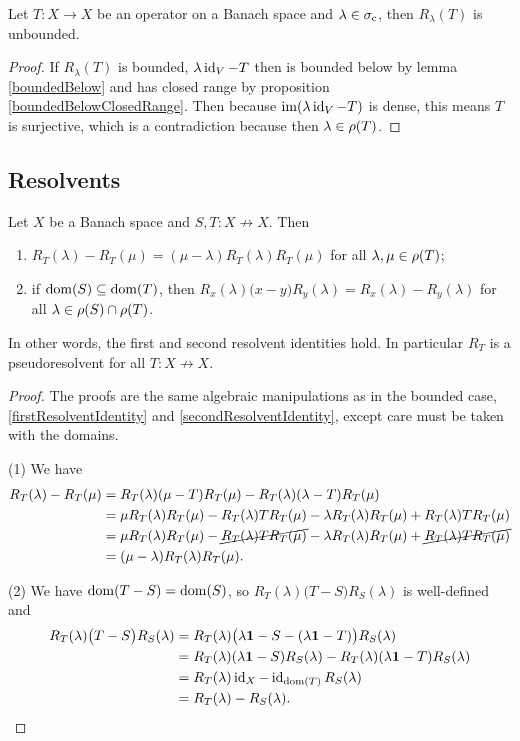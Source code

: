 \begin{proposition}
Let $T:X\to X$ be an operator on a Banach space and $\lambda\in\sigma_\text{c}$, then $R_\lambda(T)$ is unbounded.
\end{proposition}
\begin{proof}
If $R_\lambda(T)$ is bounded, $\lambda \operatorname{id}_V - T$ then is bounded below by lemma \ref{boundedBelow} and has closed range by proposition \ref{boundedBelowClosedRange}. Then because $\operatorname{im}(\lambda \operatorname{id}_V - T)$ is dense, this means $T$ is surjective, which is a contradiction because then $\lambda\in\rho(T)$.
\end{proof}

\subsection{Resolvents}

\begin{proposition}
Let $X$ be a Banach space and $S,T: X\not\to X$. Then
\begin{enumerate}
\item $R_T(\lambda) - R_T(\mu) = (\mu - \lambda)R_T(\lambda)R_T(\mu)$ for all $\lambda, \mu\in \rho(T)$;
\item if $\operatorname{dom}(S)\subseteq \operatorname{dom}(T)$, then $R_x(\lambda)\big(x-y\big)R_y(\lambda) = R_x(\lambda) - R_y(\lambda)$ for all $\lambda\in \rho(S)\cap \rho(T)$.
\end{enumerate}
\end{proposition}
In other words, the first and second resolvent identities hold.
In particular $R_T$ is a pseudoresolvent for all $T:X\not\to X$.
\begin{proof}
The proofs are the same algebraic manipulations as in the bounded case, \ref{firstResolventIdentity} and \ref{secondResolventIdentity}, except care must be taken with the domains.

(1) We have
\begin{align*}
R_T(\lambda) - R_T(\mu) &= R_T(\lambda)(\mu - T)R_T(\mu) - R_T(\lambda)(\lambda - T)R_T(\mu) \\
&= \mu R_T(\lambda)R_T(\mu) - R_T(\lambda)TR_T(\mu) - \lambda R_T(\lambda)R_T(\mu) + R_T(\lambda)TR_T(\mu) \\
&= \mu R_T(\lambda)R_T(\mu) - \cancel{R_T(\lambda)TR_T(\mu)} - \lambda R_T(\lambda)R_T(\mu) + \cancel{R_T(\lambda)TR_T(\mu)} \\
&= (\mu - \lambda)R_T(\lambda)R_T(\mu).
\end{align*}

(2) We have $\operatorname{dom}(T-S) = \operatorname{dom}(S)$, so $R_T(\lambda)\big(T-S\big)R_S(\lambda)$ is well-defined and
\begin{align*}
R_T(\lambda)\big(T-S\big)R_S(\lambda) &= R_T(\lambda)\big(\lambda\boldsymbol{\mathrm{1}}-S - (\lambda\boldsymbol{\mathrm{1}} - T)\big)R_S(\lambda) \\
&= R_T(\lambda)(\lambda\boldsymbol{\mathrm{1}}-S)R_S(\lambda) - R_T(\lambda)(\lambda\boldsymbol{\mathrm{1}} - T)R_S(\lambda) \\
&= R_T(\lambda)\operatorname{id}_{X} - \operatorname{id}_{\operatorname{dom}(T)}R_S(\lambda) \\
&= R_T(\lambda) - R_S(\lambda).
\end{align*}
\end{proof}


